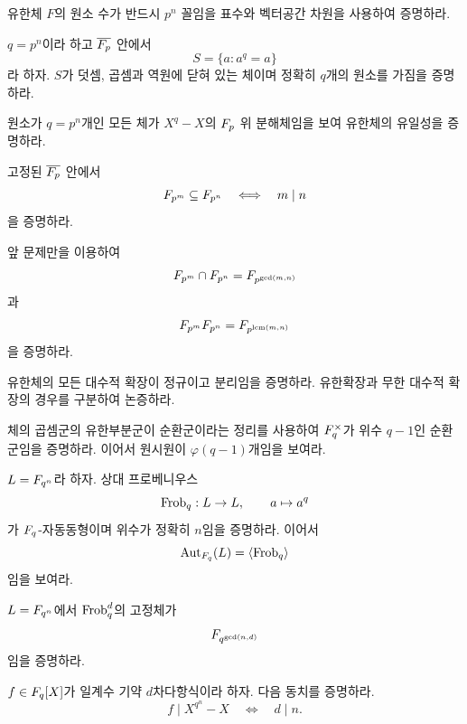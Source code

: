 \begin{exercise}
유한체 $F$의 원소 수가 반드시 $p^n$ 꼴임을 표수와 벡터공간 차원을 사용하여 증명하라.
\end{exercise}

\begin{exercise}[*]
$q=p^n$이라 하고 $\overline{F_p}$ 안에서
\[
  S=\{a:a^q=a\}
\]
라 하자. $S$가 덧셈, 곱셈과 역원에 닫혀 있는 체이며 정확히 $q$개의 원소를 가짐을 증명하라.
\end{exercise}

\begin{exercise}
원소가 $q=p^n$개인 모든 체가 $X^q-X$의 $F_p$ 위 분해체임을 보여 유한체의 유일성을 증명하라.
\end{exercise}

\begin{exercise}[*]
고정된 $\overline{F_p}$ 안에서
\[
  F_{p^m}\subseteq F_{p^n}
  \quad\Longleftrightarrow\quad
  m\mid n
\]
을 증명하라.
\end{exercise}

\begin{exercise}
앞 문제만을 이용하여
\[
  F_{p^m}\cap F_{p^n}=F_{p^{\gcd(m,n)}}
\]
과
\[
  F_{p^m}F_{p^n}=F_{p^{\operatorname{lcm}(m,n)}}
\]
을 증명하라.
\end{exercise}

\begin{exercise}
유한체의 모든 대수적 확장이 정규이고 분리임을 증명하라. 유한확장과 무한 대수적 확장의 경우를 구분하여 논증하라.
\end{exercise}

\begin{exercise}
체의 곱셈군의 유한부분군이 순환군이라는 정리를 사용하여 $F_q^\times$가 위수 $q-1$인 순환군임을 증명하라. 이어서 원시원이 $\varphi(q-1)$개임을 보여라.
\end{exercise}

\begin{exercise}[*]
$L=F_{q^n}$라 하자. 상대 프로베니우스
\[
  \operatorname{Frob}_q:L\to L,\qquad a\mapsto a^q
\]
가 $F_q$-자동동형이며 위수가 정확히 $n$임을 증명하라. 이어서
\[
  \operatorname{Aut}_{F_q}(L)=\langle\operatorname{Frob}_q\rangle
\]
임을 보여라.
\end{exercise}

\begin{exercise}
$L=F_{q^n}$에서 $\operatorname{Frob}_q^d$의 고정체가
\[
  F_{q^{\gcd(n,d)}}
\]
임을 증명하라.
\end{exercise}

\begin{exercise}[*]
$f\in F_q[X]$가 일계수 기약 $d$차다항식이라 하자. 다음 동치를 증명하라.
\[
  f\mid X^{q^n}-X
  \quad\Longleftrightarrow\quad
  d\mid n.
\]
\end{exercise}

